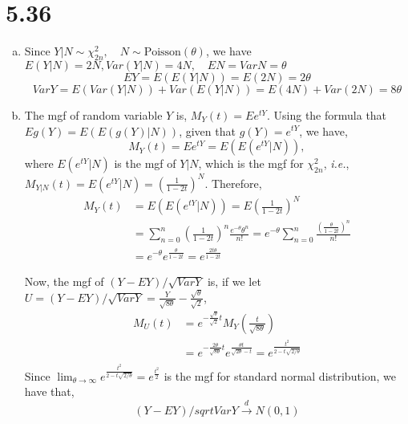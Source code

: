 \documentclass[letterpaper]{article}
\begin{document}
\section*{5.36}
\begin{enumerate}[(a)]
\item Since $Y|N \sim \chi^2_{2n}, \quad N \sim \text{Poisson}(\theta)$, we have $E(Y|N) = 2N, Var(Y|N) = 4N, \quad EN = Var N = \theta$
\[
EY = E(E(Y|N)) = E(2N) = 2\theta
\]
\[
Var Y = E(Var(Y|N)) + Var(E(Y|N)) = E(4N) + Var(2N) = 8\theta
\]
\item The mgf of random variable $Y$ is, $M_Y(t) = Ee^{tY}$. Using the formula that $Eg(Y) = E(E(g(Y)|N))$, given that $g(Y) = e^{tY}$, we have,
\[
M_Y(t) = Ee^{tY} = E(E(e^{tY}|N)),
\]
where $E(e^{tY}|N)$ is the mgf of $Y|N$, which is the mgf for $\chi^2_{2n}$, \emph{i.e.}, $M_{Y|N}(t) = E(e^{tY}|N) = \left(\frac{1}{1-2t} \right)^N$. Therefore,
\begin{align*}
M_Y(t) & = E(E(e^{tY}|N)) = E\left(\frac{1}{1-2t}\right)^N \\
& = \sum_{n=0}^n \left(\frac{1}{1-2t}\right)^n \frac{e^{-\theta} \theta^n}{n!} = e^{-\theta}\sum_{n=0}^n \frac{\left(\frac{\theta}{1-2t}\right)^n}{n!} \\
& = e^{-\theta} e^{\frac{\theta}{1-2t}} = e^{\frac{2t\theta}{1-2t}}
\end{align*}

Now, the mgf of $(Y-EY)/\sqrt{VarY}$ is, if we let $U = (Y-EY)/\sqrt{VarY} = \frac{Y}{\sqrt{8\theta}} - \frac{\sqrt{\theta}}{\sqrt{2}}$,
\begin{align*}
M_U(t) & = e^{-\frac{\sqrt{\theta}}{\sqrt{2}}t} M_Y(\frac{t}{\sqrt{8\theta}}) \\
& = e^{-\frac{2\theta}{\sqrt{8\theta}}t} e^{\frac{\theta t}{\sqrt{2\theta} - t}} = e^{\frac{t^2}{2-t\sqrt{2/\theta}}} \\
\end{align*}
Since $\lim_{\theta \to \infty} e^{\frac{t^2}{2-t\sqrt{2/\theta}}} = e^{\frac{t^2}{2}}$ is the mgf for standard normal distribution, we have that,
\[
(Y-EY)/sqrt{VarY} \stackrel{d}{\to} N(0, 1)
\]

\end{enumerate}
\end{document}
